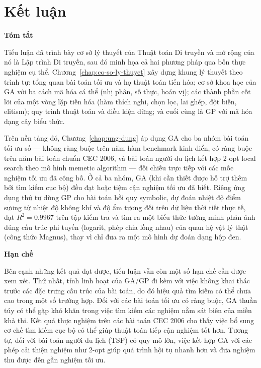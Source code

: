 \chapter*{Kết luận}
\label{chap:ket-luan}

\noindent\textbf{Tóm tắt}
\medskip

Tiểu luận đã trình bày cơ sở lý thuyết của Thuật toán Di truyền
và mở rộng của nó là Lập trình Di truyền, sau đó minh họa cả hai
phương pháp qua bốn thực nghiệm cụ thể. Chương~\ref{chap:co-so-ly-thuyet}
xây dựng khung lý thuyết theo trình tự: tổng quan bài toán tối ưu và
họ thuật toán tiến hóa; cơ sở khoa học của GA với ba cách mã hóa cá
thể (nhị phân, số thực, hoán vị); các thành phần cốt lõi của một vòng
lặp tiến hóa (hàm thích nghi, chọn lọc, lai ghép, đột biến, elitism);
quy trình thuật toán và điều kiện dừng; và cuối cùng là GP với mã hóa
dạng cây biểu thức.

Trên nền tảng đó, Chương~\ref{chap:ung-dung} áp dụng GA cho ba nhóm
bài toán tối ưu số — không ràng buộc trên năm hàm benchmark kinh điển,
có ràng buộc trên năm bài toán chuẩn CEC 2006, và bài toán người du
lịch kết hợp 2-opt local search theo mô hình memetic algorithm — đối
chiếu trực tiếp với các mốc nghiệm tối ưu đã công bố. Ở cả ba nhóm,
GA (khi cần thiết được hỗ trợ thêm bởi tìm kiếm cục bộ) đều đạt hoặc
tiệm cận nghiệm tối ưu đã biết. Riêng ứng dụng thứ tư dùng GP cho bài
toán hồi quy symbolic, dự đoán nhiệt độ điểm sương từ nhiệt độ không
khí và độ ẩm tương đối trên dữ liệu thời tiết thực tế, đạt
$R^2 = 0.9967$ trên tập kiểm tra và tìm ra một biểu thức tường minh
phản ánh đúng cấu trúc phi tuyến (logarit, phép chia lồng nhau) của
quan hệ vật lý thật (công thức Magnus), thay vì chỉ đưa ra một mô hình
dự đoán dạng hộp đen.

\bigskip
\noindent\textbf{Hạn chế}
\medskip

Bên cạnh những kết quả đạt được, tiểu luận vẫn còn một số hạn chế cần
được xem xét. Thứ nhất, tính linh hoạt của GA/GP đi kèm với việc không
khai thác trước các đặc trưng cấu trúc của bài toán, do đó hiệu quả tìm
kiếm có thể chưa cao trong một số trường hợp. Đối với các bài toán tối
ưu có ràng buộc, GA thuần túy có thể gặp khó khăn trong việc tìm kiếm
các nghiệm nằm sát biên của miền khả thi. Kết quả thực nghiệm trên các
bài toán CEC 2006 cho thấy việc bổ sung cơ chế tìm kiếm cục bộ có thể
giúp thuật toán tiếp cận nghiệm tốt hơn. Tương tự, đối với bài toán
người du lịch (TSP) có quy mô lớn, việc kết hợp GA với các phép cải
thiện nghiệm như 2-opt giúp quá trình hội tụ nhanh hơn và đưa nghiệm
thu được đến gần nghiệm tối ưu.

